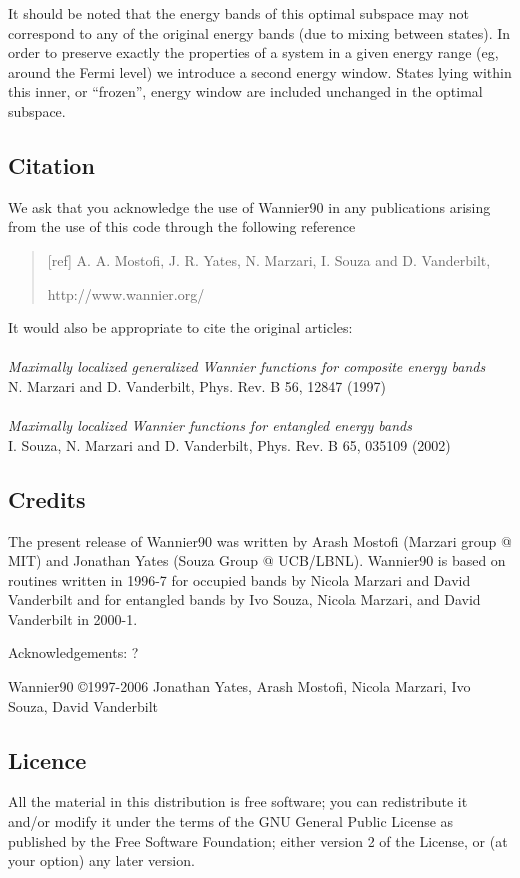 It should be noted that the energy bands of this
optimal subspace may not correspond to any of the original energy
bands (due to mixing between states). In order to preserve exactly the
properties of a system in a given energy range (eg, around the Fermi
level) we introduce a second  energy window. States lying
within this inner, or ``frozen'', energy window are included unchanged
in the optimal subspace.

\subsection{Citation}
We ask that you acknowledge the use of Wannier90 in any publications
arising from the use of this code through the following reference
\begin{quote}
[ref] A. A. Mostofi, J. R. Yates,
N. Marzari, I. Souza and D. Vanderbilt,  

 http://www.wannier.org/                 
\end{quote}                                                              

It would also be appropriate to cite the original articles:\\\\
{\it Maximally localized generalized Wannier functions for composite energy bands}\\
N. Marzari and D. Vanderbilt, Phys. Rev. B 56, 12847 (1997)\\\\
{\it Maximally localized Wannier functions for entangled energy bands}\\
I. Souza, N. Marzari and D. Vanderbilt, Phys. Rev. B 65, 035109 (2002)


\subsection{Credits}
The present release of Wannier90 was written by Arash Mostofi (Marzari
group @ MIT) and Jonathan Yates (Souza Group @ UCB/LBNL). Wannier90 is
based on routines written in 1996-7 for occupied bands by Nicola Marzari
and David Vanderbilt and for entangled bands by Ivo Souza, Nicola Marzari,
and David Vanderbilt in 2000-1. 

Acknowledgements: ?

Wannier90 \copyright 1997-2006 Jonathan Yates, Arash
Mostofi, Nicola Marzari, Ivo Souza, David Vanderbilt      

\subsection{Licence}
All the material in this distribution is free software; you can
redistribute it and/or 
modify it under the terms of the GNU General Public License
as published by the Free Software Foundation; either version 2
of the License, or (at your option) any later version.

